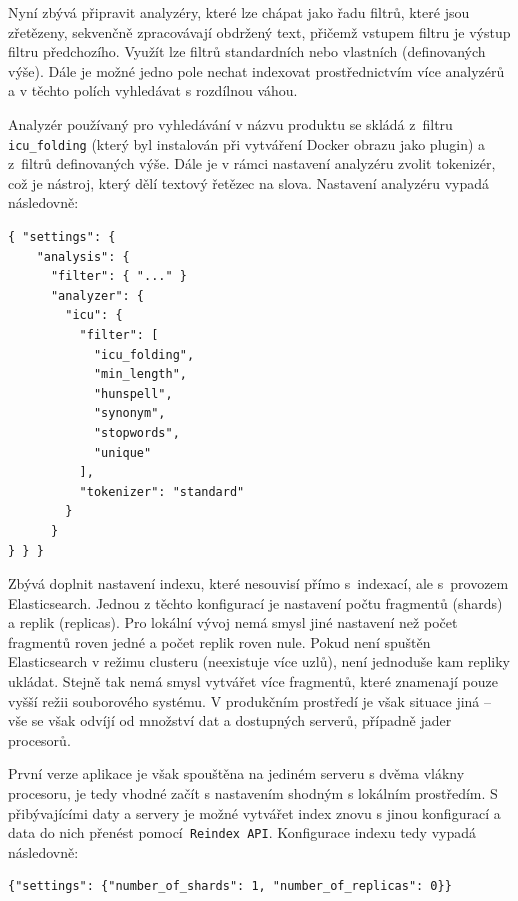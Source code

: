\documentclass[FM,DP]{tulthesis}
\newenvironment{code}
    {\filbreak\captionsetup{type=listing}}{\filbreak}
\begin{document}
Nyní zbývá připravit analyzéry, které lze chápat jako řadu filtrů, které jsou zřetězeny, 
sekvenčně zpracovávají obdržený text, přičemž vstupem filtru je výstup filtru předchozího. Využít 
lze filtrů standardních nebo vlastních (definovaných výše). Dále je možné jedno pole nechat indexovat
prostřednictvím více analyzérů a v těchto polích vyhledávat s rozdílnou váhou. 

Analyzér používaný pro vyhledávání v názvu produktu se skládá z~filtru \verb|icu_folding| 
(který byl instalován při vytváření Docker obrazu jako plugin) a z~filtrů definovaných výše.
Dále je v rámci nastavení analyzéru zvolit tokenizér, což je nástroj, který dělí textový
řetězec na slova. Nastavení analyzéru vypadá následovně:

\begin{code}
\captionsetup{singlelinecheck=false,justification=raggedright}
\label{code:es-analyzers}
\begin{verbatim}
{ "settings": {
    "analysis": {
      "filter": { "..." }
      "analyzer": {
        "icu": {
          "filter": [
            "icu_folding",
            "min_length",
            "hunspell",
            "synonym",
            "stopwords",
            "unique"
          ],
          "tokenizer": "standard"
        }
      }
} } }
\end{verbatim}
\end{code}

Zbývá doplnit nastavení indexu, které nesouvisí přímo s~indexací, ale s~provozem Elasticsearch.
Jednou z těchto konfigurací je nastavení počtu fragmentů (shards) a replik (replicas).
Pro lokální vývoj nemá smysl jiné nastavení než počet fragmentů roven jedné a počet
replik roven nule. Pokud není spuštěn Elasticsearch v režimu clusteru (neexistuje více uzlů), 
není jednoduše kam repliky ukládat. Stejně tak nemá smysl vytvářet více fragmentů, které
znamenají pouze vyšší režii souborového systému. V produkčním prostředí je však situace jiná --
vše se však odvíjí od množství dat a dostupných serverů, případně jader procesorů.

První verze aplikace je však spouštěna na jediném serveru s dvěma vlákny procesoru, je tedy
vhodné začít s nastavením shodným s lokálním prostředím. S přibývajícími daty a servery je
možné vytvářet index znovu s jinou konfigurací a data do nich přenést pomocí\verb| Reindex API|.
Konfigurace indexu tedy vypadá následovně:

\begin{code}
\captionsetup{singlelinecheck=false,justification=raggedright}
\label{code:es-settings}
\begin{verbatim}
{"settings": {"number_of_shards": 1, "number_of_replicas": 0}}
\end{verbatim}
\end{code}
\end{document}
